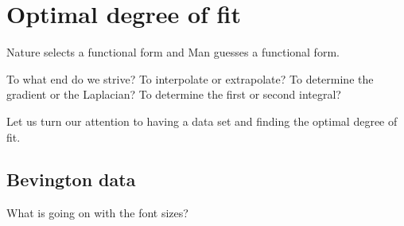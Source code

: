 \section{\label{sec:optimal dof}Optimal degree of fit}

Nature selects a functional form and Man guesses a functional form.

To what end do we strive? To interpolate or extrapolate? To determine the gradient or the Laplacian? To determine the first or second integral?

Let us turn our attention to having a data set and finding the optimal degree of fit.

\subsection{Bevington data}  %
What is going on with the font sizes?


\endinput  %

